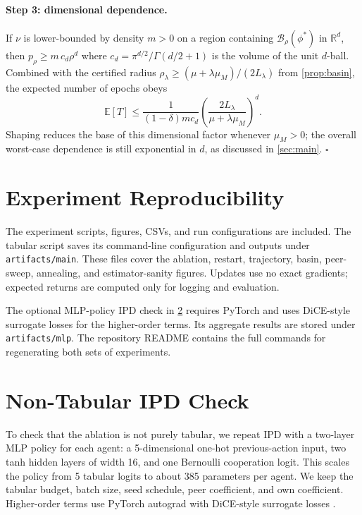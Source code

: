 \documentclass{article}
\theoremstyle{plain}
\theoremstyle{definition}
\theoremstyle{remark}
\newcommand{\E}{\mathbb{E}}
\newcommand{\R}{\mathbb{R}}
\newcommand{\B}{\mathcal{B}}
\begin{document}
\paragraph{Step 3: dimensional dependence.}
If $\nu$ is lower-bounded by density $m>0$ on a region containing $\B_\rho(\phi^\ast)$ in $\R^d$, then $p_\rho\ge m\,c_d\rho^d$ where $c_d=\pi^{d/2}/\Gamma(d/2+1)$ is the volume of the unit $d$-ball. Combined with the certified radius $\rho_\lambda\ge (\mu+\lambda\mu_M)/(2L_\lambda)$ from \cref{prop:basin}, the expected number of epochs obeys
\[
\E[T]\le \frac{1}{(1-\delta)m c_d}\!\left(\frac{2L_\lambda}{\mu+\lambda\mu_M}\right)^{\!d}.
\]
Shaping reduces the base of this dimensional factor whenever $\mu_M>0$; the overall worst-case dependence is still exponential in $d$, as discussed in \cref{sec:main}. $\square$

\section{Experiment Reproducibility}\label{app:repro}

The experiment scripts, figures, CSVs, and run configurations are included. The tabular script saves its command-line configuration and outputs under \texttt{artifacts/main}. These files cover the ablation, restart, trajectory, basin, peer-sweep, annealing, and estimator-sanity figures. Updates use no exact gradients; expected returns are computed only for logging and evaluation.

The optional MLP-policy IPD check in \cref{app:mlp} requires PyTorch and uses DiCE-style surrogate losses for the higher-order terms. Its aggregate results are stored under \texttt{artifacts/mlp}. The repository README contains the full commands for regenerating both sets of experiments.

\section{Non-Tabular IPD Check}\label{app:mlp}

To check that the ablation is not purely tabular, we repeat IPD with a two-layer MLP policy for each agent: a 5-dimensional one-hot previous-action input, two tanh hidden layers of width 16, and one Bernoulli cooperation logit. This scales the policy from 5 tabular logits to about 385 parameters per agent. We keep the tabular budget, batch size, seed schedule, peer coefficient, and own coefficient. Higher-order terms use PyTorch autograd with DiCE-style surrogate losses \citep{foerster2018dice}.
\end{document}
